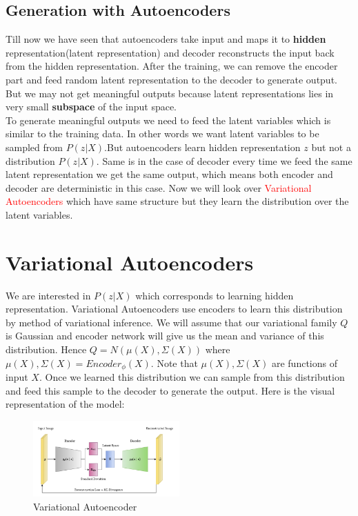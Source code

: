 \documentclass[10pt,a4paper]{article}
\begin{document}
\subsection{Generation with Autoencoders}
Till now we have seen that autoencoders take input and maps it to \textbf{hidden} representation(latent representation) and decoder reconstructs the input back from the hidden representation. After the training, we can remove the encoder part and feed random latent representation to the decoder to generate output. But we may not get meaningful outputs because latent representations lies in very small \textbf{subspace} of the input space.\\
To generate meaningful outputs we need to feed the latent variables which is similar to the training data. In other words we want latent variables to be sampled from $P(z|X)$.But autoencoders learn hidden representation $z$ but not a distribution $P(z|X)$. Same is in the case of decoder every time we feed the same latent representation we get the same output, which means both encoder and decoder are deterministic in this case. Now we will look over \textcolor{red}{Variational Autoencoders} which have same structure but they learn the distribution over the latent variables.

\section{Variational Autoencoders}
We are interested in $P(z|X)$ which corresponds to learning hidden representation. Variational Autoencoders use encoders to learn this distribution by method of variational inference. We will assume that our variational family $Q$ is Gaussian and encoder network will give us the mean and variance of this distribution. Hence $Q = N(\mu(X), \Sigma(X))$ where $\mu(X), \Sigma(X) = Encoder_{\phi}(X)$. Note that $\mu(X), \Sigma(X)$ are functions of input $X$. Once we learned this distribution we can sample from this distribution and feed this sample to the decoder to generate the output. Here is the visual representation of the model:

\begin{figure}[h]
    \centering
    \includegraphics[width=0.5\textwidth]{vae.png}
    \caption{Variational Autoencoder}
    \label{fig:my_label}
\end{figure}
\end{document}
